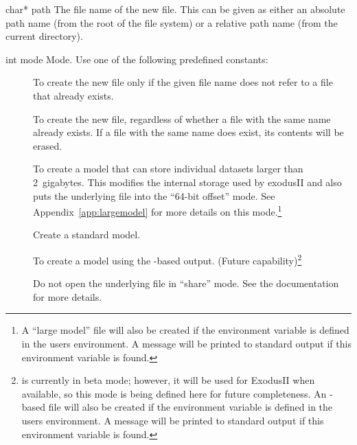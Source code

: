 \begin{parameters}
\item[{char* path \R{}}]
The file name of the new \exo{} file. This can be given as either an
absolute path name (from the root of the file system) or a relative
path name (from the current directory).


\item[{int mode \R{}}]
Mode. Use one of the following predefined constants:

\begin{description}
\item[]
To create the new file only if the given file name does not refer to a
file that already exists.

\item[]
To create the new file, regardless of whether a file with the same
name already exists. If a file with the same name does exist, its
contents will be erased.

\item[]
To create a model that can store individual datasets larger than
2~gigabytes. This modifies the internal storage used by exodusII and
also puts the underlying  file into the ``64-bit offset''
mode. See Appendix~\ref{app:largemodel} for more details on this
mode.\footnote{A ``large model'' file will also be created if the
environment variable
 is defined
in the users environment. A message will be printed to standard output
if this environment variable is found.}

\item[]
Create a standard model.

\item[]
To create a model using the -based 
output. (Future capability)\footnote{ is currently in
beta mode; however, it will be used for ExodusII when available, so
this mode is being defined here for future completeness. An
-based  file will also be created if the
environment variable  is defined in the
users environment. A message will be printed to standard output if
this environment variable is found.}

\item[]
Do not open the underlying  file in ``share'' mode. See the
 documentation for more details.


\end{description}
\end{parameters}
